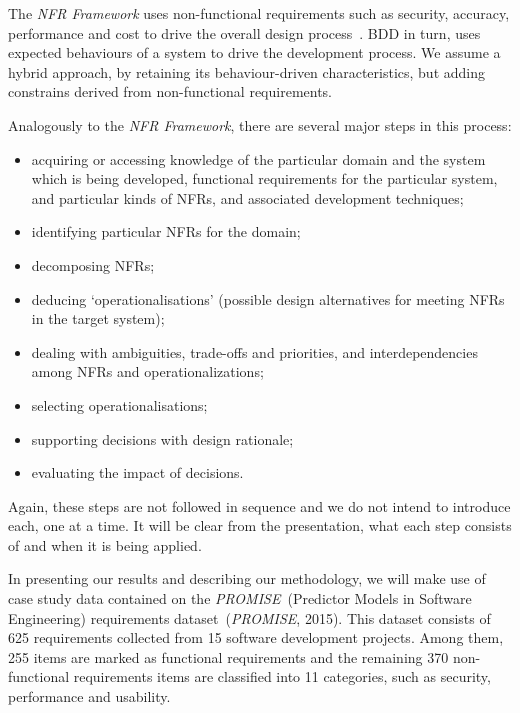 \documentclass[dissertation,final]{softeng}
\begin{document}
The \emph{NFR Framework} uses non-functional requirements such as security, accuracy, performance and cost to drive the overall design process~\citep{Chung2000}. BDD in turn, uses expected behaviours of a system to drive the development process. We assume a hybrid approach, by retaining its behaviour-driven characteristics, but adding constrains derived from non-functional requirements.

Analogously to the \emph{NFR Framework}, there are several major steps in this process:
\begin{itemize}
\item acquiring or accessing knowledge of the particular domain and the system which is being developed, functional requirements for the particular system, and particular kinds of NFRs, and associated development techniques;
\item identifying particular NFRs for the domain;
\item decomposing NFRs;
\item deducing `operationalisations' (possible design alternatives for meeting NFRs in the target system);
\item dealing with ambiguities, trade-offs and priorities, and interdependencies among NFRs and operationalizations;
\item selecting operationalisations;
\item supporting decisions with design rationale;
\item evaluating the impact of decisions.
\end{itemize}

Again, these steps are not followed in sequence and we do not intend to introduce each, one at a time. It will be clear from the presentation, what each step consists of and when it is being applied.

In presenting our results and describing our methodology, we will make use of case study data contained on the \emph{PROMISE}~(Predictor Models in Software Engineering) requirements dataset~(\emph{PROMISE}, 2015). This dataset consists of 625 requirements collected from 15 software development projects. Among them, 255 items are marked as functional requirements and the remaining 370 non-functional requirements items are classified into 11 categories, such as security, performance and usability.
\end{document}
